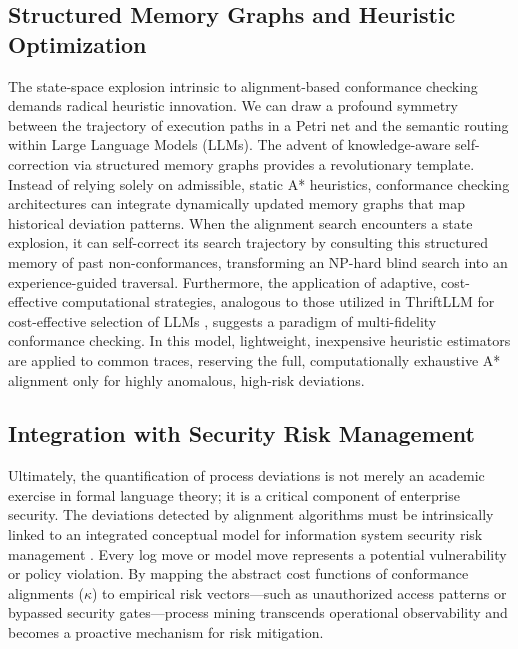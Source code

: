 \subsection{Structured Memory Graphs and Heuristic Optimization}
The state-space explosion intrinsic to alignment-based conformance checking demands radical heuristic innovation. We can draw a profound symmetry between the trajectory of execution paths in a Petri net and the semantic routing within Large Language Models (LLMs). The advent of knowledge-aware self-correction via structured memory graphs \cite{ref_KnowledgeAwareS10} provides a revolutionary template. Instead of relying solely on admissible, static A* heuristics, conformance checking architectures can integrate dynamically updated memory graphs that map historical deviation patterns. When the alignment search encounters a state explosion, it can self-correct its search trajectory by consulting this structured memory of past non-conformances, transforming an NP-hard blind search into an experience-guided traversal. Furthermore, the application of adaptive, cost-effective computational strategies, analogous to those utilized in ThriftLLM for cost-effective selection of LLMs \cite{ref_ThriftLLMOnCost15}, suggests a paradigm of multi-fidelity conformance checking. In this model, lightweight, inexpensive heuristic estimators are applied to common traces, reserving the full, computationally exhaustive A* alignment only for highly anomalous, high-risk deviations.

\subsection{Integration with Security Risk Management}
Ultimately, the quantification of process deviations is not merely an academic exercise in formal language theory; it is a critical component of enterprise security. The deviations detected by alignment algorithms must be intrinsically linked to an integrated conceptual model for information system security risk management \cite{ref_AnIntegratedCon8}. Every log move or model move represents a potential vulnerability or policy violation. By mapping the abstract cost functions of conformance alignments ($\kappa$) to empirical risk vectors—such as unauthorized access patterns or bypassed security gates—process mining transcends operational observability and becomes a proactive mechanism for risk mitigation.

